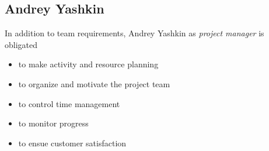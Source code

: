 \subsection{Andrey Yashkin}
In addition to team requirements, Andrey Yashkin as \textit{project manager} is obligated 
\begin{itemize}
	\item to make activity and resource planning
	\item to organize and motivate the project team
	\item to control time management
	\item to monitor progress
	\item to ensue customer satisfaction
\end{itemize}
